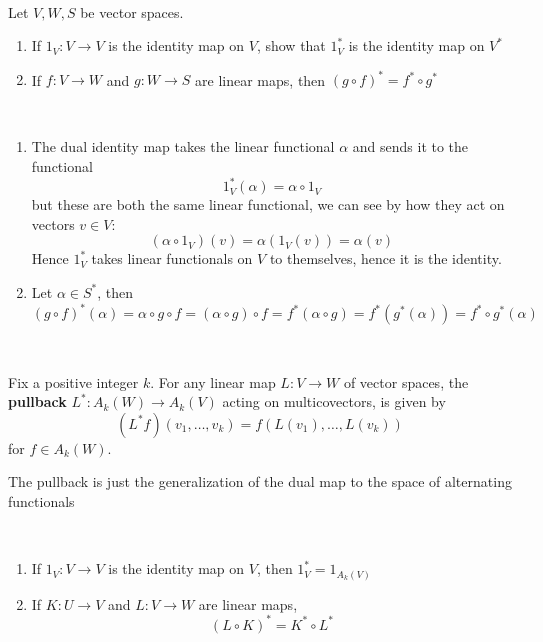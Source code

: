 \documentclass{article}
\begin{document}
\begin{proposition}
  \

  Let $V, W, S$ be vector spaces.
  \begin{enumerate}
    \item If $1_V: V \to V$ is the identity map on $V$, show that $1_V^*$ is the identity map on $V^*$
    \item If $f: V \to W$ and $g: W \to S$ are linear maps, then $(g \circ f)^* = f^* \circ g^*$
  \end{enumerate}
\end{proposition}

\begin{customproof}
  \

  \begin{enumerate}
    \item The dual identity map takes the linear functional $\alpha$ and sends it to the functional$$1_V^*(\alpha) = \alpha \circ 1_V$$but these are both the same linear functional, we can see by how they act on vectors $v \in V$: $$(\alpha \circ 1_V)(v) = \alpha(1_V(v)) = \alpha(v)$$Hence $1_V^*$ takes linear functionals on $V$ to themselves, hence it is the identity.
    \item Let $\alpha \in S^*$, then $$(g \circ f)^*(\alpha) = \alpha \circ g \circ f = (\alpha \circ g) \circ f = f^*(\alpha \circ g) = f^*(g^*(\alpha)) = f^* \circ g^*(\alpha)$$
  \end{enumerate}
\end{customproof}

\begin{definition}[Pullbacks]
  \

  Fix a positive integer $k$. For any linear map $L: V \to W$ of vector spaces, the \textbf{pullback} $L^*: A_k(W) \to A_k(V)$ acting on multicovectors, is given by $$(L^*f)(v_1, \dots, v_k) = f(L(v_1), \dots, L(v_k))$$for $f \in A_k(W)$.

  The pullback is just the generalization of the dual map to the space of alternating functionals
\end{definition}

\begin{proposition}
  \

  \begin{enumerate}
    \item If $1_V: V \to V$ is the identity map on $V$, then $1_V^* = 1_{A_k(V)}$
    \item If $K: U \to V$ and $L: V \to W$ are linear maps, $$(L \circ K)^* = K^* \circ L^*$$
  \end{enumerate}
\end{proposition}
\end{document}
